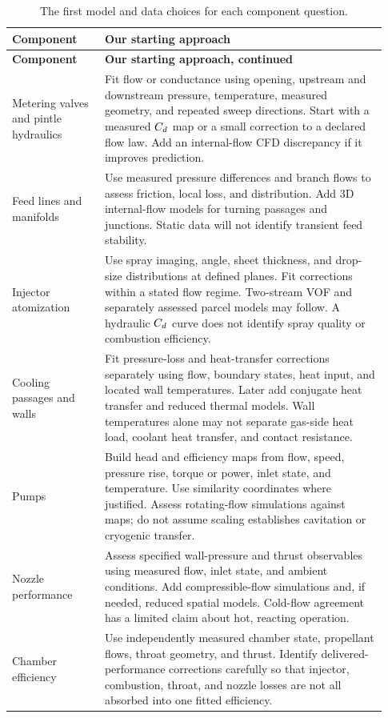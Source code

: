 \begin{longtable}{@{}P{0.23\linewidth}P{0.70\linewidth}@{}}
\caption{The first model and data choices for each component question.}\\
\toprule
\textbf{Component} & \textbf{Our starting approach}\\
\midrule
\endfirsthead
\toprule \textbf{Component} & \textbf{Our starting approach, continued}\\ \midrule
\endhead
\bottomrule
\endfoot
Metering valves and pintle hydraulics &
Fit flow or conductance using opening, upstream and downstream pressure, temperature, measured geometry, and repeated sweep directions. Start with a measured $C_d$ map or a small correction to a declared flow law. Add an internal-flow CFD discrepancy if it improves prediction.\\
Feed lines and manifolds &
Use measured pressure differences and branch flows to assess friction, local loss, and distribution. Add 3D internal-flow models for turning passages and junctions. Static data will not identify transient feed stability.\\
Injector atomization &
Use spray imaging, angle, sheet thickness, and drop-size distributions at defined planes. Fit corrections within a stated flow regime. Two-stream VOF and separately assessed parcel models may follow. A hydraulic $C_d$ curve does not identify spray quality or combustion efficiency.\\
Cooling passages and walls &
Fit pressure-loss and heat-transfer corrections separately using flow, boundary states, heat input, and located wall temperatures. Later add conjugate heat transfer and reduced thermal models. Wall temperatures alone may not separate gas-side heat load, coolant heat transfer, and contact resistance.\\
Pumps &
Build head and efficiency maps from flow, speed, pressure rise, torque or power, inlet state, and temperature. Use similarity coordinates where justified. Assess rotating-flow simulations against maps; do not assume scaling establishes cavitation or cryogenic transfer.\\
Nozzle performance &
Assess specified wall-pressure and thrust observables using measured flow, inlet state, and ambient conditions. Add compressible-flow simulations and, if needed, reduced spatial models. Cold-flow agreement has a limited claim about hot, reacting operation.\\
Chamber efficiency &
Use independently measured chamber state, propellant flows, throat geometry, and thrust. Identify delivered-performance corrections carefully so that injector, combustion, throat, and nozzle losses are not all absorbed into one fitted efficiency.\\

\end{longtable}

